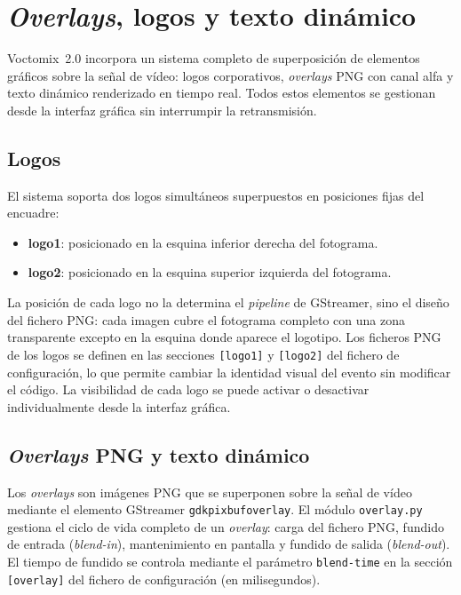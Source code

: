 \section{\textit{Overlays}, logos y texto dinámico}
\label{sec:overlays}

Voctomix~2.0 incorpora un sistema completo de superposición de elementos gráficos
sobre la señal de vídeo: logos corporativos, \textit{overlays} \ac{PNG} con canal alfa y texto
dinámico renderizado en tiempo real. Todos estos elementos se gestionan desde la
interfaz gráfica sin interrumpir la retransmisión.

\subsection{Logos}

El sistema soporta dos logos simultáneos superpuestos en posiciones fijas del encuadre:

\begin{itemize}
  \item \textbf{logo1}: posicionado en la esquina inferior derecha del fotograma.
  \item \textbf{logo2}: posicionado en la esquina superior izquierda del fotograma.
\end{itemize}

La posición de cada logo no la determina el \textit{pipeline} de GStreamer, sino el diseño
del fichero PNG: cada imagen cubre el fotograma completo con una zona transparente
excepto en la esquina donde aparece el logotipo. Los ficheros PNG de los logos se
definen en las secciones \texttt{[logo1]} y \texttt{[logo2]} del fichero de
configuración, lo que permite cambiar la identidad visual del evento sin modificar el código. La visibilidad de cada logo se puede activar o
desactivar individualmente desde la interfaz gráfica.

\subsection{\textit{Overlays} PNG y texto dinámico}

Los \textit{overlays} son imágenes PNG que se superponen sobre la señal de vídeo
mediante el elemento GStreamer \texttt{gdkpixbufoverlay}. El módulo
\texttt{overlay.py} gestiona el ciclo de vida completo de un \textit{overlay}:
carga del fichero PNG, fundido de entrada (\textit{blend-in}), mantenimiento en
pantalla y fundido de salida (\textit{blend-out}). El tiempo de fundido se controla
mediante el parámetro \texttt{blend-time} en la sección \texttt{[overlay]} del
fichero de configuración (en milisegundos).

